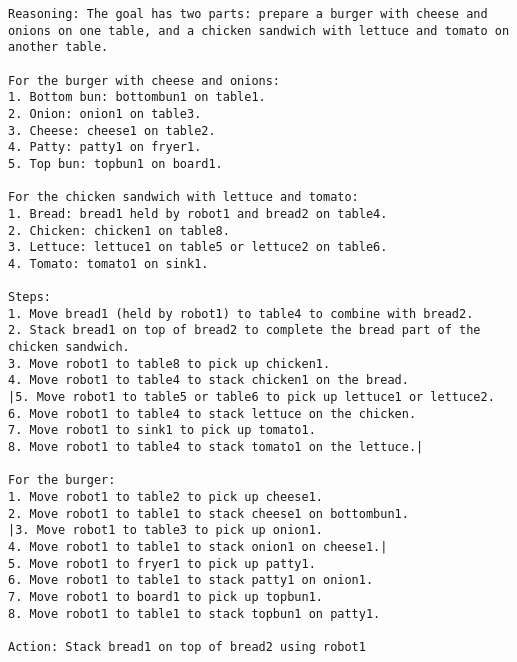 \begin{lstlisting}
Reasoning: The goal has two parts: prepare a burger with cheese and onions on one table, and a chicken sandwich with lettuce and tomato on another table. 

For the burger with cheese and onions:
1. Bottom bun: bottombun1 on table1.
2. Onion: onion1 on table3.
3. Cheese: cheese1 on table2.
4. Patty: patty1 on fryer1.
5. Top bun: topbun1 on board1.

For the chicken sandwich with lettuce and tomato:
1. Bread: bread1 held by robot1 and bread2 on table4.
2. Chicken: chicken1 on table8.
3. Lettuce: lettuce1 on table5 or lettuce2 on table6.
4. Tomato: tomato1 on sink1.

Steps:
1. Move bread1 (held by robot1) to table4 to combine with bread2.
2. Stack bread1 on top of bread2 to complete the bread part of the chicken sandwich.
3. Move robot1 to table8 to pick up chicken1.
4. Move robot1 to table4 to stack chicken1 on the bread.
|5. Move robot1 to table5 or table6 to pick up lettuce1 or lettuce2.
6. Move robot1 to table4 to stack lettuce on the chicken.
7. Move robot1 to sink1 to pick up tomato1.
8. Move robot1 to table4 to stack tomato1 on the lettuce.|

For the burger:
1. Move robot1 to table2 to pick up cheese1.
2. Move robot1 to table1 to stack cheese1 on bottombun1.
|3. Move robot1 to table3 to pick up onion1.
4. Move robot1 to table1 to stack onion1 on cheese1.|
5. Move robot1 to fryer1 to pick up patty1.
6. Move robot1 to table1 to stack patty1 on onion1.
7. Move robot1 to board1 to pick up topbun1.
8. Move robot1 to table1 to stack topbun1 on patty1.

Action: Stack bread1 on top of bread2 using robot1
\end{lstlisting}
